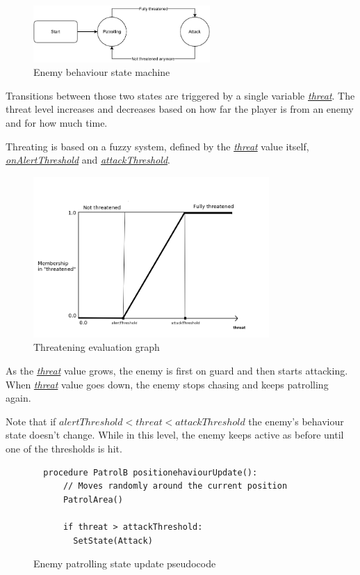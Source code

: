 \documentclass[11pt]{article}
\newcommand{\varname}[1]{\underline{\textit{#1}}}
\begin{document}
\begin{figure}[H]
  \centering
  \includegraphics[width=0.6\textwidth]{figures/enemy_behaviour_states}
  \caption{Enemy behaviour state machine}
\end{figure}

Transitions between those two states are triggered by a single variable \varname{threat}. The threat level increases and decreases based on how far the player is from an enemy and for how much time.

Threating is based on a fuzzy system, defined by the \varname{threat} value itself, \varname{onAlertThreshold} and \varname{attackThreshold}.

\begin{figure}[H]
  \centering
  \includegraphics[width=0.8\textwidth]{figures/threat_graph}
  \caption{Threatening evaluation graph}
\end{figure}

As the \varname{threat} value grows, the enemy is first on guard and then starts attacking. When \varname{threat} value goes down, the enemy stops chasing and keeps patrolling again.

Note that if $alertThreshold < threat < attackThreshold$ the enemy's behaviour state doesn't change. While in this level, the enemy keeps active as before until one of the thresholds is hit.

\FloatBarrier

\begin{figure}
  \begin{lstlisting}
  procedure PatrolB positionehaviourUpdate():
      // Moves randomly around the current position
      PatrolArea() 

      if threat > attackThreshold:
        SetState(Attack)
  \end{lstlisting}
  \caption{Enemy patrolling state update pseudocode}
\end{figure}
\end{document}

